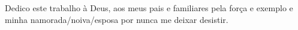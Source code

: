 Dedico este trabalho à Deus, aos meus pais e familiares pela força e exemplo e
minha namorada/noiva/esposa por nunca me deixar desistir.

